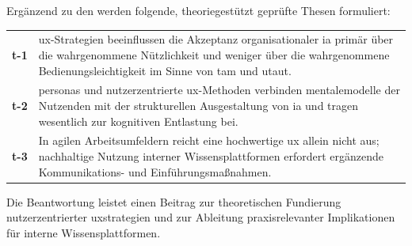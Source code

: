 Ergänzend zu den  werden folgende, theoriegestützt geprüfte Thesen formuliert:

\begin{table}[H]
    \centering
    \begin{tabular}{p{} p{}}
        \textbf{\acrshort{t}-1} & \Gls{ux}-Strategien beeinflussen die Akzeptanz organisationaler \acrlong{ia} primär über die wahrgenommene Nützlichkeit und weniger über die wahrgenommene Bedienungsleichtigkeit im Sinne von \acrshort{tam} und \acrshort{utaut}. \\[1em]

        \textbf{\acrshort{t}-2} & \Gls{personas} und nutzerzentrierte \Gls{ux}-Methoden verbinden \gls{mentalemodelle} der Nutzenden mit der strukturellen Ausgestaltung von \acrlong{ia} und tragen wesentlich zur kognitiven Entlastung bei.             \\[1em]

        \textbf{\acrshort{t}-3} & In agilen Arbeitsumfeldern reicht eine hochwertige \acrlong{ux} allein nicht aus; nachhaltige Nutzung interner Wissensplattformen erfordert ergänzende Kommunikations- und Einführungsmaßnahmen.              \\
    \end{tabular}
\end{table}

Die Beantwortung leistet einen Beitrag zur theoretischen Fundierung nutzerzentrierter \Gls{uxstrategien} und zur Ableitung praxisrelevanter Implikationen für interne Wissensplattformen.




